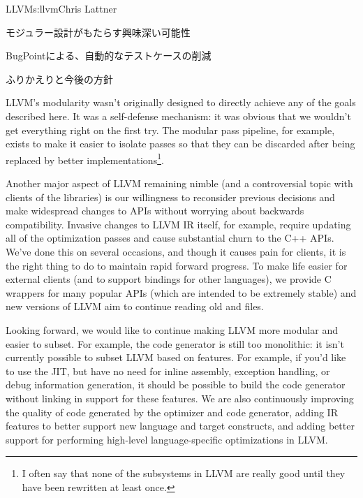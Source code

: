 \begin{aosachapter}{LLVM}{s:llvm}{Chris Lattner}
\begin{aosasect1}{モジュラー設計がもたらす興味深い可能性}
\begin{aosasect2}{BugPointによる、自動的なテストケースの削減}
\end{aosasect2}

\end{aosasect1}

\begin{aosasect1}{ふりかえりと今後の方針}

LLVM's modularity wasn't originally designed to directly achieve any
of the goals described here. It was a self-defense mechanism: it was
obvious that we wouldn't get everything right on the first try.  The
modular pass pipeline, for example, exists to make it easier to
isolate passes so that they can be discarded after being replaced by
better implementations\footnote{I often say that none of the
subsystems in LLVM are really good until they have been rewritten at
least once.}.

Another major aspect of LLVM remaining nimble (and a controversial
topic with clients of the libraries) is our willingness to reconsider
previous decisions and make widespread changes to APIs without
worrying about backwards compatibility.  Invasive changes to LLVM IR
itself, for example, require updating all of the optimization passes
and cause substantial churn to the C++ APIs.  We've done this on
several occasions, and though it causes pain for clients, it is the
right thing to do to maintain rapid forward progress.  To make life
easier for external clients (and to support bindings for other
languages), we provide C wrappers for many popular APIs (which are
intended to be extremely stable) and new versions of LLVM aim to
continue reading old  and  files.

Looking forward, we would like to continue making LLVM more modular
and easier to subset.  For example, the code generator is still too
monolithic: it isn't currently possible to subset LLVM based on
features.  For example, if you'd like to use the JIT, but have no need
for inline assembly, exception handling, or debug information
generation, it should be possible to build the code generator without
linking in support for these features.  We are also continuously
improving the quality of code generated by the optimizer and code
generator, adding IR features to better support new language and
target constructs, and adding better support for performing high-level
language-specific optimizations in LLVM.


\end{aosasect1}
\end{aosachapter}
